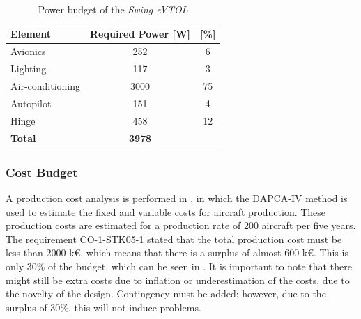\begin{table}[h]
    \caption{Power budget of the \textit{Swing eVTOL}}
    \label{tab:power_budgets}
    \centering
    \begin{tabular}{l|S[table-format=6]S[table-format=2.2]}
    \toprule
    \textbf{Element} & \textbf{Required Power [\unit{\W}]} & \textbf{[\unit{\%}]} \\ \midrule
    Avionics  & 252 &  6\\
    Lighting  & 117  & 3\\
    Air-conditioning  & 3000 & 75 \\
    Autopilot  & 151 & 4\\
    Hinge  &  458 & 12 \\ \midrule
    \textbf{Total} & \textbf{3978} \\
    \bottomrule
    \end{tabular}
    
\end{table}

\subsubsection{Cost Budget}
A production cost analysis is performed in , in which the DAPCA-IV method is used to estimate the fixed and variable costs for aircraft production.
These production costs are estimated for a production rate of 200 aircraft per five years.
The requirement CO-1-STK05-1 stated that the total production cost must be less than 2000 k€,
which means that there is a surplus of almost 600 k€.
This is only $30\%$ of the budget, which can be seen in .
It is important to note that there might still be extra costs due to inflation or underestimation of the costs, due to the novelty of the design. 
Contingency must be added; however, due to the surplus of 30$\%$, this will not induce problems.

